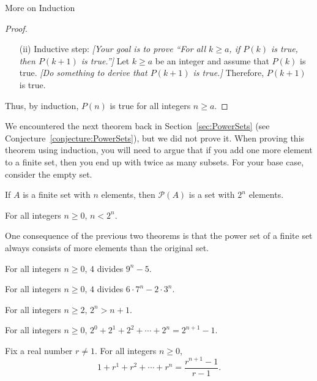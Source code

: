 \begin{section}{More on Induction}
\begin{skeleton}
\begin{mdframed}[style=skeleton]
\begin{proof}
\begin{enumerate}
\item[(ii)] Inductive step:  \emph{[Your goal is to prove ``For all $k\geq a$, if $P(k)$ is true, then $P(k+1)$ is true.'']} Let $k \geq a$ be an integer and assume that $P(k)$ is true. \emph{[Do something to derive that $P(k+1)$ is true.]} Therefore, $P(k+1)$ is true.
\end{enumerate}
Thus, by induction, $P(n)$ is true for all integers $n \ge a$.
\end{proof}
\end{mdframed}
\end{skeleton}

We encountered the next theorem back in Section~\ref{sec:PowerSets} (see Conjecture~\ref{conjecture:PowerSets}), but we did not prove it. When proving this theorem using induction, you will need to argue that if you add one more element to a finite set, then you end up with twice as many subsets. For your base case, consider the empty set.

\begin{theorem}\label{thm:size of power set for finite sets}
If $A$ is a finite set with $n$ elements, then $\mathcal{P}(A)$ is a set with $2^{n}$ elements.
\end{theorem}

\begin{theorem}\label{thm:n<2^n}
For all integers $n \ge 0$, $n<2^n$.
\end{theorem}

One consequence of the previous two theorems is that the power set of a finite set always consists of more elements than the original set.

\begin{theorem}
For all integers $n \ge 0$, $4$ divides $9^n - 5$.
\end{theorem}

\begin{theorem}
For all integers $n \ge 0$, $4$ divides $6\cdot 7^n - 2 \cdot 3^n$.
\end{theorem}

\begin{theorem}
For all integers $n \ge 2$, $2^n > n + 1$.
\end{theorem}

\begin{theorem}
For all integers $n \ge 0$, $2^0 + 2^1 + 2^2 + \cdots + 2^n = 2^{n+1} - 1$.
\end{theorem}

\begin{theorem}
Fix a real number $r \neq 1$. For all integers $n \ge 0$,
$$\displaystyle{1 + r^1 + r^2 + \cdots + r^n = \frac{r^{n+1} - 1}{r-1}}.$$
\end{theorem}


\end{section}
